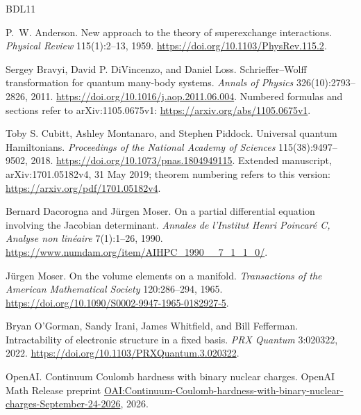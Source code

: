 \par
{}
\begin{thebibliography}{BDL11}

P.~W. Anderson.
\newblock New approach to the theory of superexchange interactions.
\newblock \emph{Physical Review} 115(1):2--13, 1959.
\newblock \url{https://doi.org/10.1103/PhysRev.115.2}.

Sergey Bravyi, David P. DiVincenzo, and Daniel Loss.
\newblock Schrieffer--Wolff transformation for quantum many-body systems.
\newblock \emph{Annals of Physics} 326(10):2793--2826, 2011.
\newblock \url{https://doi.org/10.1016/j.aop.2011.06.004}.
\newblock Numbered formulas and sections refer to arXiv:1105.0675v1:
\url{https://arxiv.org/abs/1105.0675v1}.

Toby S. Cubitt, Ashley Montanaro, and Stephen Piddock.
\newblock Universal quantum Hamiltonians.
\newblock \emph{Proceedings of the National Academy of Sciences}
115(38):9497--9502, 2018.
\newblock \url{https://doi.org/10.1073/pnas.1804949115}.
\newblock Extended manuscript, arXiv:1701.05182v4, 31 May 2019;
theorem numbering refers to this version:
\url{https://arxiv.org/pdf/1701.05182v4}.

Bernard Dacorogna and J\"urgen Moser.
\newblock On a partial differential equation involving the Jacobian determinant.
\newblock \emph{Annales de l'Institut Henri Poincar\'e C, Analyse non lin\'eaire}
7(1):1--26, 1990.
\newblock \url{https://www.numdam.org/item/AIHPC_1990__7_1_1_0/}.

J\"urgen Moser.
\newblock On the volume elements on a manifold.
\newblock \emph{Transactions of the American Mathematical Society}
120:286--294, 1965.
\newblock \url{https://doi.org/10.1090/S0002-9947-1965-0182927-5}.

Bryan O'Gorman, Sandy Irani, James Whitfield, and Bill Fefferman.
\newblock Intractability of electronic structure in a fixed basis.
\newblock \emph{PRX Quantum} 3:020322, 2022.
\newblock \url{https://doi.org/10.1103/PRXQuantum.3.020322}.

OpenAI.
\newblock Continuum Coulomb hardness with binary nuclear charges.
\newblock OpenAI Math Release preprint
\href{https://github.com/openai/math/blob/main/preprints/Continuum-Coulomb-hardness-with-binary-nuclear-charges-September-24-2026/Continuum-Coulomb-hardness-with-binary-nuclear-charges-September-24-2026.pdf}{OAI:Continuum-Coulomb-hardness-with-binary-nuclear-charges-September-24-2026}, 2026.


\end{thebibliography}
